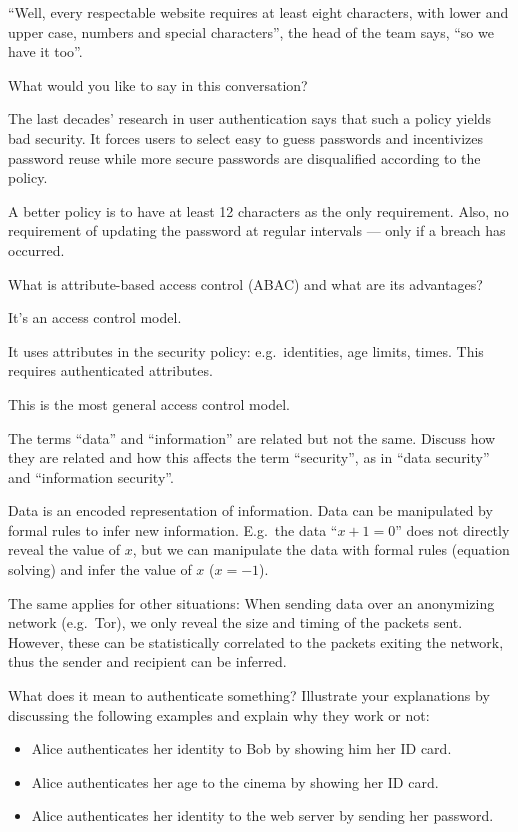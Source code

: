 \enquote{Well, every respectable website requires at least eight characters, 
  with lower and upper case, numbers and special characters}, the head of the 
team says, \enquote{so we have it too}.

What would you like to say in this conversation?

\begin{solution}
The last decades' research in user authentication says that such a policy yields 
bad security.
It forces users to select easy to guess passwords and incentivizes password 
reuse while more secure passwords are disqualified according to the policy.

A better policy is to have at least 12 characters as the only requirement.
Also, no requirement of updating the password at regular intervals --- only if a 
breach has occurred.
\end{solution}
\question[3]
What is attribute-based access control (ABAC) and what are its advantages?

\begin{solution}
  It's an access control model.

  It uses attributes in the security policy: e.g.\ identities, age limits, 
  times.
  This requires authenticated attributes.

  This is the most general access control model.
\end{solution}


\question[3]
  The terms \enquote{data} and \enquote{information} are related but not the 
  same.
  Discuss how they are related and how this affects the term 
  \enquote{security}, as in \enquote{data security} and \enquote{information 
  security}.

  \begin{solution}
  Data is an encoded representation of information.
  Data can be manipulated by formal rules to infer new information.
  E.g.\ the data \enquote{\(x+1 = 0\)} does not directly reveal the value of 
  \(x\), but we can manipulate the data with formal rules (equation solving) 
  and infer the value of \(x\) (\(x = -1\)).

  The same applies for other situations:
  When sending data over an anonymizing network (e.g.\ Tor), we only reveal the 
  size and timing of the packets sent.
  However, these can be statistically correlated to the packets exiting the 
  network, thus the sender and recipient can be inferred.
  \end{solution}
\question
  What does it mean to authenticate something?
  Illustrate your explanations by discussing the following examples and explain 
  why they work or not:
  \begin{itemize}
  \item Alice authenticates her identity to Bob by showing him her ID card.
  \item Alice authenticates her age to the cinema by showing her ID card.
  \item Alice authenticates her identity to the web server by sending her 
  password.
  \end{itemize}
  
